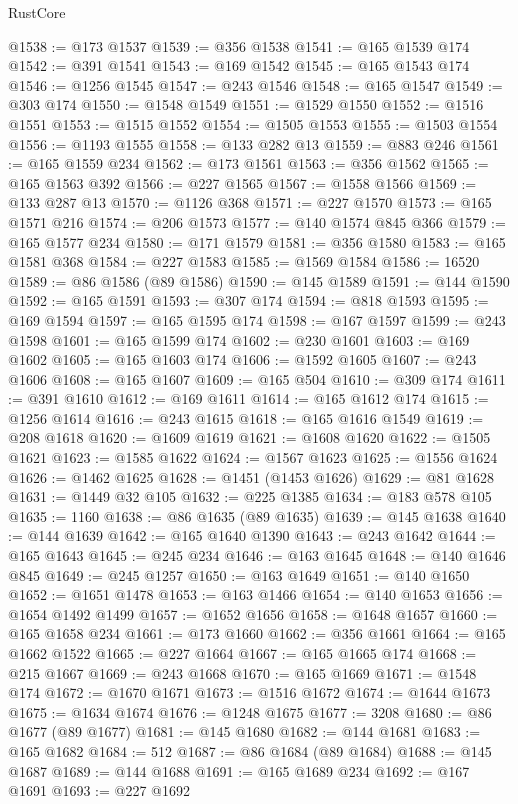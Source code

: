 \begin{lexlean}{RustCore}
\begin{coremodule}
@1538 := @173 @1537
@1539 := @356 @1538
@1541 := @165 @1539 @174
@1542 := @391 @1541
@1543 := @169 @1542
@1545 := @165 @1543 @174
@1546 := @1256 @1545
@1547 := @243 @1546
@1548 := @165 @1547
@1549 := @303 @174
@1550 := @1548 @1549
@1551 := @1529 @1550
@1552 := @1516 @1551
@1553 := @1515 @1552
@1554 := @1505 @1553
@1555 := @1503 @1554
@1556 := @1193 @1555
@1558 := @133 @282 @13
@1559 := @883 @246
@1561 := @165 @1559 @234
@1562 := @173 @1561
@1563 := @356 @1562
@1565 := @165 @1563 @392
@1566 := @227 @1565
@1567 := @1558 @1566
@1569 := @133 @287 @13
@1570 := @1126 @368
@1571 := @227 @1570
@1573 := @165 @1571 @216
@1574 := @206 @1573
@1577 := @140 @1574 @845 @366
@1579 := @165 @1577 @234
@1580 := @171 @1579
@1581 := @356 @1580
@1583 := @165 @1581 @368
@1584 := @227 @1583
@1585 := @1569 @1584
@1586 := 16520
@1589 := @86 @1586 (@89 @1586)
@1590 := @145 @1589
@1591 := @144 @1590
@1592 := @165 @1591
@1593 := @307 @174
@1594 := @818 @1593
@1595 := @169 @1594
@1597 := @165 @1595 @174
@1598 := @167 @1597
@1599 := @243 @1598
@1601 := @165 @1599 @174
@1602 := @230 @1601
@1603 := @169 @1602
@1605 := @165 @1603 @174
@1606 := @1592 @1605
@1607 := @243 @1606
@1608 := @165 @1607
@1609 := @165 @504
@1610 := @309 @174
@1611 := @391 @1610
@1612 := @169 @1611
@1614 := @165 @1612 @174
@1615 := @1256 @1614
@1616 := @243 @1615
@1618 := @165 @1616 @1549
@1619 := @208 @1618
@1620 := @1609 @1619
@1621 := @1608 @1620
@1622 := @1505 @1621
@1623 := @1585 @1622
@1624 := @1567 @1623
@1625 := @1556 @1624
@1626 := @1462 @1625
@1628 := @1451 (@1453 @1626)
@1629 := @81 @1628
@1631 := @1449 @32 @105
@1632 := @225 @1385
@1634 := @183 @578 @105
@1635 := 1160
@1638 := @86 @1635 (@89 @1635)
@1639 := @145 @1638
@1640 := @144 @1639
@1642 := @165 @1640 @1390
@1643 := @243 @1642
@1644 := @165 @1643
@1645 := @245 @234
@1646 := @163 @1645
@1648 := @140 @1646 @845
@1649 := @245 @1257
@1650 := @163 @1649
@1651 := @140 @1650
@1652 := @1651 @1478
@1653 := @163 @1466
@1654 := @140 @1653
@1656 := @1654 @1492 @1499
@1657 := @1652 @1656
@1658 := @1648 @1657
@1660 := @165 @1658 @234
@1661 := @173 @1660
@1662 := @356 @1661
@1664 := @165 @1662 @1522
@1665 := @227 @1664
@1667 := @165 @1665 @174
@1668 := @215 @1667
@1669 := @243 @1668
@1670 := @165 @1669
@1671 := @1548 @174
@1672 := @1670 @1671
@1673 := @1516 @1672
@1674 := @1644 @1673
@1675 := @1634 @1674
@1676 := @1248 @1675
@1677 := 3208
@1680 := @86 @1677 (@89 @1677)
@1681 := @145 @1680
@1682 := @144 @1681
@1683 := @165 @1682
@1684 := 512
@1687 := @86 @1684 (@89 @1684)
@1688 := @145 @1687
@1689 := @144 @1688
@1691 := @165 @1689 @234
@1692 := @167 @1691
@1693 := @227 @1692

\end{coremodule}
\end{lexlean}
